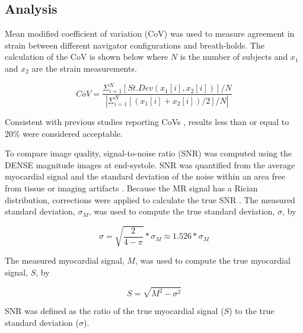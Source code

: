 \subsection{Analysis}
	Mean modified coefficient of variation (CoV) \cite{Wehner2015a,Haggerty2013,Wehner2015} was used to measure agreement in strain between different navigator configurations and breath-holds. The calculation of the CoV is shown below where $N$ is the number of subjects and $x_1$ and $x_2$ are the strain measurements.

	\begin{equation}
		\label{eq:cov}
		CoV=\frac{\Sigma_{i=1}^N[St.Dev(x_1[i],x_2[i])]/N}{|\Sigma_{i=1}^N[(x_1[i]+x_2[i])/2]/N|}
	\end{equation}

	Consistent with previous studies reporting CoVs \cite{Haggerty2013,Swoboda2014,Moody2015,Kowallick2014,Kowallick2016}, results less than or equal to 20\% were considered acceptable.
	
	To compare image quality, signal-to-noise ratio (SNR) was computed using the DENSE magnitude images at end-systole. SNR was quantified from the average myocardial signal and the standard deviation of the noise within an area free from tissue or imaging artifacts \cite{Wehner2015a,Wehner2015,Sigfridsson2011}. Because the MR signal has a Rician distribution, corrections were applied to calculate the true SNR \cite{Gudbjartsson1995}. The measured standard deviation, $\sigma_M$, was used to compute the true standard deviation, $\sigma$, by

	\begin{equation}
		\sigma = \sqrt{\frac{2}{4-\pi}}*\sigma_M \approx 1.526*\sigma_M
	\end{equation}

	The measured myocardial signal, $M$, was used to compute the true myocardial signal, $S$, by

	\begin{equation}
		S= \sqrt{M^2-\sigma^2}
	\end{equation}

	SNR was defined as the ratio of the true myocardial signal ($S$) to the true standard deviation ($\sigma$).

